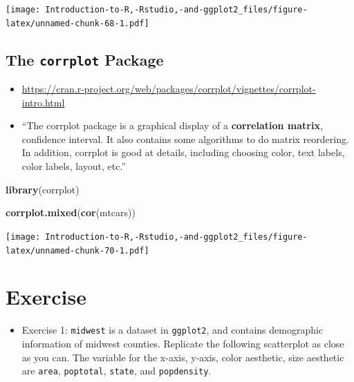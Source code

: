 \documentclass[]{book}
\newenvironment{Shaded}{\begin{snugshade}}{\end{snugshade}}
\newcommand{\KeywordTok}[1]{\textcolor[rgb]{0.13,0.29,0.53}{\textbf{{#1}}}}
\newcommand{\NormalTok}[1]{{#1}}
\providecommand{\tightlist}{%
  \setlength{\itemsep}{0pt}\setlength{\parskip}{0pt}}
\begin{document}
\texttt{[image: Introduction-to-R,-Rstudio,-and-ggplot2\_files/figure-latex/unnamed-chunk-68-1.pdf]}

\section{\texorpdfstring{The \texttt{corrplot}
Package}{The corrplot Package}}\label{the-corrplot-package}

\begin{itemize}
\tightlist
\item
  \url{https://cran.r-project.org/web/packages/corrplot/vignettes/corrplot-intro.html}
\item
  ``The corrplot package is a graphical display of a \textbf{correlation
  matrix}, confidence interval. It also contains some algorithms to do
  matrix reordering. In addition, corrplot is good at details, including
  choosing color, text labels, color labels, layout, etc.''
\end{itemize}

\begin{Shaded}
\begin{Highlighting}[]
\KeywordTok{library}\NormalTok{(corrplot)}
\end{Highlighting}
\end{Shaded}

\begin{Shaded}
\begin{Highlighting}[]
\KeywordTok{corrplot.mixed}\NormalTok{(}\KeywordTok{cor}\NormalTok{(mtcars))}
\end{Highlighting}
\end{Shaded}

\texttt{[image: Introduction-to-R,-Rstudio,-and-ggplot2\_files/figure-latex/unnamed-chunk-70-1.pdf]}

\chapter{Exercise}\label{exercise-3}

\begin{itemize}
\tightlist
\item
  Exercise 1: \texttt{midwest} is a dataset in \texttt{ggplot2}, and
  contains demographic information of midwest counties. Replicate the
  following scatterplot as close as you can. The variable for the
  x-axis, y-axis, color aesthetic, size aesthetic are \texttt{area},
  \texttt{poptotal}, \texttt{state}, and \texttt{popdensity}.
\end{itemize}
\end{document}
